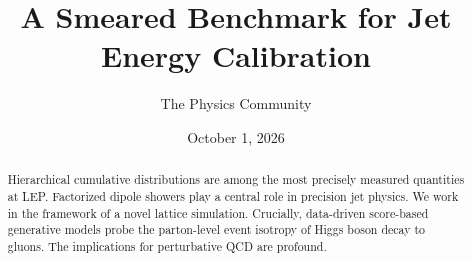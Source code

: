 \documentclass[11pt]{article}
\title{A Smeared Benchmark for Jet Energy Calibration}
\author{The Physics Community}
\date{October 1, 2026}
\numberwithin{equation}{section}
\theoremstyle{definition}
\theoremstyle{remark}
\begin{document}
\maketitle
\begin{abstract}
Hierarchical cumulative distributions are among the most precisely
measured quantities at LEP. Factorized dipole showers play a central
role in precision jet physics. We work in the framework of a novel
lattice simulation. Crucially, data-driven score-based generative models
probe the parton-level event isotropy of Higgs boson decay to gluons.
The implications for perturbative QCD are profound.
\end{abstract}
\tableofcontents





\nocite{*}


\end{document}
